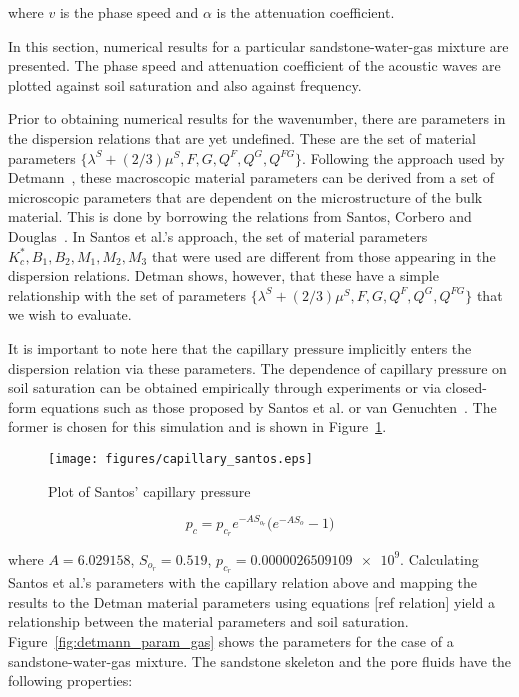 \documentclass[twocolumn]{article}
\begin{document}
where $v$ is the phase speed and $\alpha$ is the attenuation coefficient.

In this section, numerical results for a particular sandstone-water-gas mixture are presented. The phase speed and attenuation coefficient of the acoustic waves are plotted against soil saturation and also against frequency.

Prior to obtaining numerical results for the wavenumber, there are parameters in the dispersion relations that are yet undefined. These are the set of material parameters $\{\lambda^S + (2/3)\mu^S, F, G, Q^F, Q^G, Q^{FG}\}$. Following the approach used by Detmann~\cite{detmann_analysis_2009}, these macroscopic material parameters can be derived from a set of microscopic parameters that are dependent on the microstructure of the bulk material. This is done by borrowing the relations from Santos, Corbero and Douglas~\cite{santos_corbero_douglas_1990}. In Santos et al.’s approach, the set of material parameters ${K_c^*, B_1, B_2, M_1, M_2, M_3}$ that were used are different from those appearing in the dispersion relations. Detman shows, however, that these have a simple relationship with the set of parameters $\{\lambda^S + (2/3)\mu^S, F, G, Q^F, Q^G, Q^{FG}\}$ that we wish to evaluate.

It is important to note here that the capillary pressure implicitly enters the dispersion relation via these parameters. The dependence of capillary pressure on soil saturation can be obtained empirically through experiments or via closed-form equations such as those proposed by Santos et al. or van Genuchten~\cite{van_genuchten_1980}. The former is chosen for this simulation and is shown in Figure~\ref{fig:capillary_santos}.

\begin{figure}
    \centering
    \texttt{[image: figures/capillary\_santos.eps]}
    \caption{Plot of Santos' capillary pressure}
    \label{fig:capillary_santos}
\end{figure}

\begin{equation}
    p_c = p_{c_r}e^{-AS_{o_r}}\bigl(e^{-AS_o} - 1\bigr)
\end{equation}

where $A = \num{6.029158}$, $S_{o_r} = \num{0.519}$, $p_{c_r}=\num{0.0000026509109e9}$. Calculating Santos et al.’s parameters with the capillary relation above and mapping the results to the Detman material parameters using equations [ref relation] yield a relationship between the material parameters and soil saturation. Figure~\ref{fig:detmann_param_gas} shows the parameters for the case of a sandstone-water-gas mixture. The sandstone skeleton and the pore fluids have the following properties:
\end{document}

